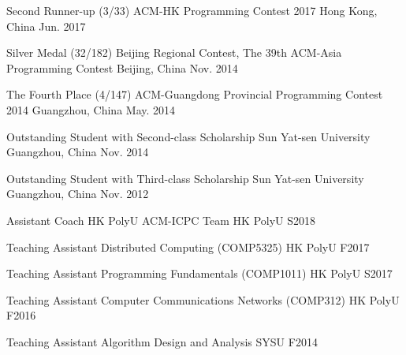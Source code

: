 \documentclass[11pt, a4paper]{awesome-cv} %
\begin{document}
\begin{cvhonors}
\cvhonor
{Second Runner-up (3/33)} %
{ACM-HK Programming Contest 2017} %
{Hong Kong, China} %
{Jun. 2017} %

\cvhonor
{Silver Medal (32/182)} %
{Beijing Regional Contest, The 39th ACM-Asia Programming Contest} %
{Beijing, China} %
{Nov. 2014} %

\cvhonor
{The Fourth Place (4/147)} %
{ACM-Guangdong Provincial Programming Contest 2014} %
{Guangzhou, China} %
{May. 2014} %

\cvhonor
{Outstanding Student with Second-class Scholarship} %
{Sun Yat-sen University} %
{Guangzhou, China} %
{Nov. 2014} %

\cvhonor
{Outstanding Student with Third-class Scholarship} %
{Sun Yat-sen University} %
{Guangzhou, China} %
{Nov. 2012} %
\end{cvhonors}

\begin{cvhonors}
\cvhonor
{Assistant Coach} %
{HK PolyU ACM-ICPC Team} %
{HK PolyU} %
{S2018} %

\cvhonor
{Teaching Assistant} %
{Distributed Computing (COMP5325)} %
{HK PolyU} %
{F2017} %

\cvhonor
{Teaching Assistant} %
{Programming Fundamentals (COMP1011)} %
{HK PolyU} %
{S2017} %

\cvhonor
{Teaching Assistant} %
{Computer Communications Networks (COMP312)} %
{HK PolyU} %
{F2016} %

\cvhonor
{Teaching Assistant} %
{Algorithm Design and Analysis} %
{SYSU} %
{F2014} %
\end{cvhonors}
\end{document}
